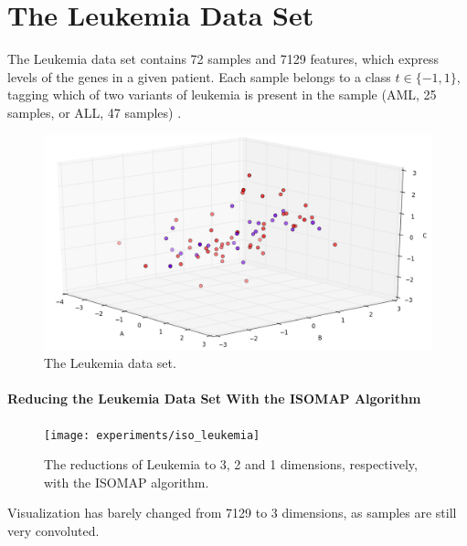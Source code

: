 \clearpage
\section{The Leukemia Data Set}

The Leukemia data set contains 72 samples and 7129 features, which express levels of the genes in a given patient. Each sample belongs to a class $t \in \{-1, 1\}$, tagging which of two variants of leukemia is present in the sample (AML, 25 samples, or ALL, 47 samples) \cite{on:duc_ds}.
\newline\newline

\begin{figure}[H]
	\centering
	\includegraphics[width=\linewidth]{img/datasets/leukemia}
	\captionsetup{justification=centering}
	\caption{The Leukemia data set.}
\end{figure}

\newpage
\paragraph{Reducing the Leukemia Data Set With the ISOMAP Algorithm}

\begin{figure}[H]
	\centering
	\captionsetup{justification=centering}
	\texttt{[image: experiments/iso\_leukemia]}
	\caption{The reductions of Leukemia to 3, 2 and 1 dimensions, respectively, with the ISOMAP algorithm.}
	\label{fig:dsleukemiaiso}
\end{figure}

Visualization has barely changed from 7129 to 3 dimensions, as samples are still very convoluted.

